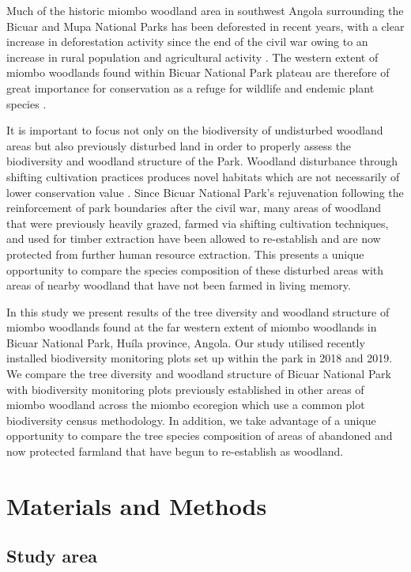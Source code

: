 \documentclass[diversity,article,submit,moreauthors,pdftex]{Definitions/mdpi}
\begin{document}
Much of the historic miombo woodland area in southwest Angola surrounding the Bicuar and Mupa National Parks has been deforested in recent years, with a clear increase in deforestation activity since the end of the civil war owing to an increase in rural population and agricultural activity \citep{Schneibel2013, Huntley2019}. The western extent of miombo woodlands found within Bicuar National Park plateau are therefore of great importance for conservation as a refuge for wildlife and endemic plant species \citep{Huntley2019}.

It is important to focus not only on the biodiversity of undisturbed woodland areas but also previously disturbed land in order to properly assess the biodiversity and woodland structure of the Park. Woodland disturbance through shifting cultivation practices produces novel habitats which are not necessarily of lower conservation value \citep{McNicol2015, Goncalves2017}. Since Bicuar National Park's rejuvenation following the reinforcement of park boundaries after the civil war, many areas of woodland that were previously heavily grazed, farmed via shifting cultivation techniques, and used for timber extraction have been allowed to re-establish and are now protected from further human resource extraction. This presents a unique opportunity to compare the species composition of these disturbed areas with areas of nearby woodland that have not been farmed in living memory.

In this study we present results of the tree diversity and woodland structure of miombo woodlands found at the far western extent of miombo woodlands in Bicuar National Park, Hu\'{i}la province, Angola. Our study utilised recently installed biodiversity monitoring plots set up within the park in 2018 and 2019. We compare the tree diversity and woodland structure of Bicuar National Park with biodiversity monitoring plots previously established in other areas of miombo woodland across the miombo ecoregion which use a common plot biodiversity census methodology. In addition, we take advantage of a unique opportunity to compare the tree species composition of areas of abandoned and now protected farmland that have begun to re-establish as woodland.

\section{Materials and Methods}

\subsection{Study area}
\end{document}
